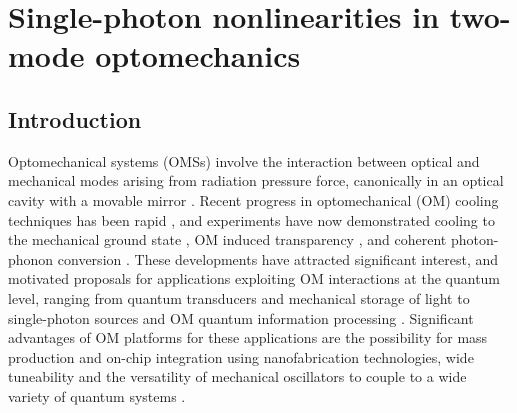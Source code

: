 \chapter{Single-photon nonlinearities in two-mode optomechanics}
\label{ch:Komar2013}


\section{Introduction}
Optomechanical systems (OMSs) involve the interaction between optical and mechanical
modes arising from 
radiation pressure force, canonically in an optical
cavity with a movable mirror \cite{Kippenberg2008,
Marquardt2009, AspelmeyerNJP2008, Genes2009, Favero2009}.
Recent progress in optomechanical (OM) cooling techniques
has been rapid \cite{Metzger2004, Gigan2006, Arcizet2006, Kleckner2006,
Corbitt2007, Schliesser2008,Thompson2008,Wilson2009}, 
and 
experiments have now demonstrated cooling to the
mechanical ground state
\cite{O'Connell2010,Teufel2011,Chan2011},
OM induced transparency \cite{Weis2010,Safavi-Naeini2011},
and coherent
photon-phonon conversion \cite{Fiore2011,Verhagen2011,Hill2012}.
These developments have
attracted significant interest, and
motivated proposals for applications
exploiting OM interactions at the quantum level,
ranging  from
quantum   
 transducers  
 \cite{Stannigel2010,Safavi-Naeini2011a,Regal2011,Taylor2011}
 and mechanical storage of light \cite{Zhang2003, Akram2010,Chang2011}
 to single-photon sources \cite{Rabl2011} and OM quantum information processing 
 \cite{Stannigel2012,Schmidt2012}.
Significant advantages of OM platforms for these 
applications are
 the possibility for mass production and on-chip integration using
 nanofabrication  technologies, %
 wide tuneability 
 and the versatility of mechanical oscillators 
 to
 couple to a wide variety of quantum systems \cite{Schoelkopf2008}.
 
